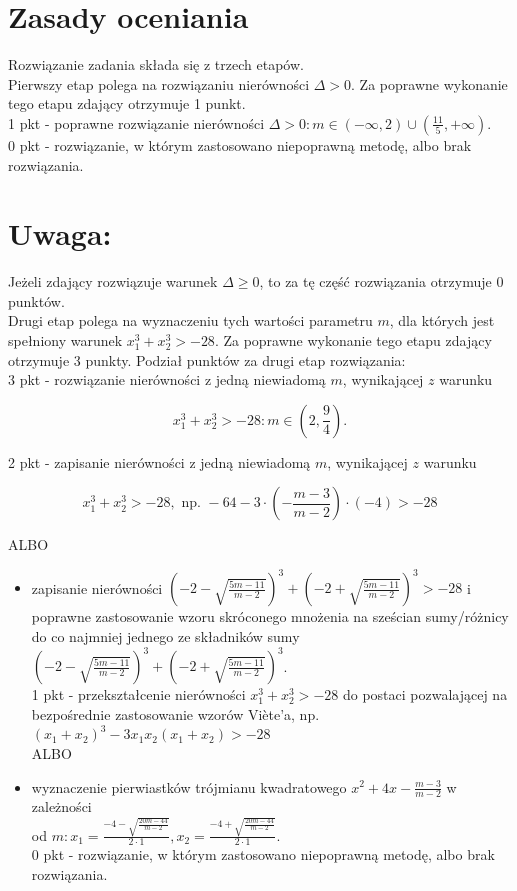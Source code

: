 \documentclass[10pt]{article}
\begin{document}
\section*{Zasady oceniania}
Rozwiązanie zadania składa się z trzech etapów.\\
Pierwszy etap polega na rozwiązaniu nierówności $\Delta>0$. Za poprawne wykonanie tego etapu zdający otrzymuje 1 punkt.\\
1 pkt - poprawne rozwiązanie nierówności $\Delta>0: m \in(-\infty, 2) \cup\left(\frac{11}{5},+\infty\right)$.\\
0 pkt - rozwiązanie, w którym zastosowano niepoprawną metodę, albo brak rozwiązania.

\section*{Uwaga:}
Jeżeli zdający rozwiązuje warunek $\Delta \geq 0$, to za tę część rozwiązania otrzymuje 0 punktów.\\
Drugi etap polega na wyznaczeniu tych wartości parametru $m$, dla których jest spełniony warunek $x_{1}^{3}+x_{2}^{3}>-28$. Za poprawne wykonanie tego etapu zdający otrzymuje 3 punkty. Podział punktów za drugi etap rozwiązania:\\
3 pkt - rozwiązanie nierówności z jedną niewiadomą $m$, wynikającej $z$ warunku

$$
x_{1}^{3}+x_{2}^{3}>-28: m \in\left(2, \frac{9}{4}\right) .
$$

2 pkt - zapisanie nierówności z jedną niewiadomą $m$, wynikającej $z$ warunku

$$
x_{1}^{3}+x_{2}^{3}>-28, \text { np. }-64-3 \cdot\left(-\frac{m-3}{m-2}\right) \cdot(-4)>-28
$$

ALBO

\begin{itemize}
  \item zapisanie nierówności $\left(-2-\sqrt{\frac{5 m-11}{m-2}}\right)^{3}+\left(-2+\sqrt{\frac{5 m-11}{m-2}}\right)^{3}>-28$ i poprawne zastosowanie wzoru skróconego mnożenia na sześcian sumy/różnicy do co najmniej jednego ze składników sumy $\left(-2-\sqrt{\frac{5 m-11}{m-2}}\right)^{3}+\left(-2+\sqrt{\frac{5 m-11}{m-2}}\right)^{3}$.\\
1 pkt - przekształcenie nierówności $x_{1}^{3}+x_{2}^{3}>-28$ do postaci pozwalającej na\\
bezpośrednie zastosowanie wzorów Viète'a, np.\\
$\left(x_{1}+x_{2}\right)^{3}-3 x_{1} x_{2}\left(x_{1}+x_{2}\right)>-28$\\
ALBO
  \item wyznaczenie pierwiastków trójmianu kwadratowego $x^{2}+4 x-\frac{m-3}{m-2}$ w zależności\\
od $m: x_{1}=\frac{-4-\sqrt{\frac{20 m-44}{m-2}}}{2 \cdot 1}, x_{2}=\frac{-4+\sqrt{\frac{20 m-44}{m-2}}}{2 \cdot 1}$.\\
0 pkt - rozwiązanie, w którym zastosowano niepoprawną metodę, albo brak rozwiązania.
\end{itemize}
\end{document}
